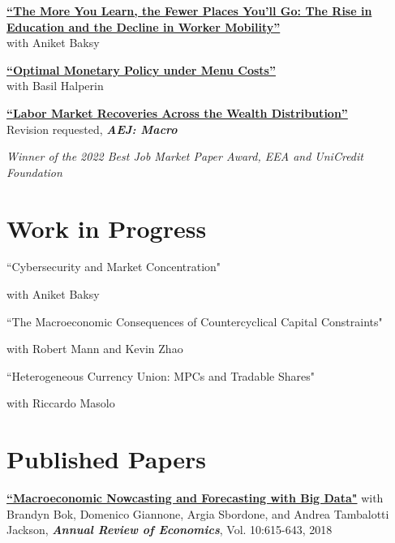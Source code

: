 \documentclass[margin,line]{res}                          %
\newenvironment{list1}{
	\begin{list}{\ding{113}}{%
			\setlength{\itemsep}{0in}
			\setlength{\parsep}{0in} \setlength{\parskip}{0in}
			\setlength{\topsep}{0in} \setlength{\partopsep}{0in}
			\setlength{\leftmargin}{0.17in}}}{\end{list}}
\begin{document}
\begin{resume}
\begin{list1}
		\item[] \href{https://danicaratelli.github.io/research/papers/The_Long_term_Decline_of_the_US_Job_Ladder.pdf}{\textbf{{\color{darkblue}``The More You Learn, the Fewer Places You’ll Go: The Rise in Education and the Decline in Worker Mobility''}}}\\ 
		with Aniket Baksy\smallskip
		
		\vspace{7pt}
		
		\item[] \href{https://danicaratelli.github.io/research/papers/OptimalMP_CaratelliHalperin.pdf}{\textbf{``Optimal Monetary Policy under Menu Costs''}}\\ with Basil Halperin\smallskip
		
		\vspace{7pt}
		
		\item[] \href{https://danicaratelli.github.io/research/papers/JMP_Caratelli.pdf}{\textbf{{\color{darkblue}``Labor Market Recoveries Across the Wealth Distribution''}}}\\
		Revision requested, \textit{\textbf{AEJ: Macro}}
		\item[] \emph{\textit{Winner of the 2022 Best Job Market Paper Award, EEA and UniCredit Foundation}}\smallskip
		
	\end{list1}
	
	\section{\sc Work in Progress}
	\begin{list1}
		\item[] ``Cybersecurity and Market Concentration"		
		\item[] with Aniket Baksy \smallskip
		\vspace{7pt}
		\item[] ``The Macroeconomic Consequences of Countercyclical Capital Constraints"
		\item[] with Robert Mann and Kevin Zhao
		\vspace{7pt}
		\item[] ``Heterogeneous Currency Union: MPCs and Tradable Shares"		
		\item[] with Riccardo Masolo \smallskip
	\end{list1}
	
	\section{\sc Published Papers}
	\begin{list1}
		\item[] \href{https://www.annualreviews.org/doi/abs/10.1146/annurev-economics-083120-111540}{\textbf{``Macroeconomic Nowcasting and Forecasting with Big Data"}} with  Brandyn Bok, Domenico Giannone, Argia Sbordone, and Andrea Tambalotti  Jackson, \textit{\textbf{Annual Review of Economics}}, Vol. 10:615-643, 2018 \smallskip
	\end{list1}
	

\end{resume}
\end{document}
